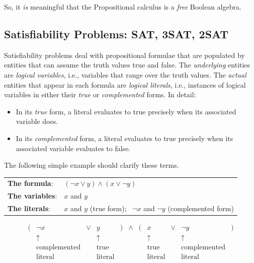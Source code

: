 So, it {\em is} meaningful that the Propositional calculus is a {\em
  free} Boolean algebra.


\subsection{Satisfiability Problems: {\sf SAT}, {\sf 3SAT}, {\sf 2SAT}}
\label{sec:Satisfiability}

Satisfiability problems deal with propositional formulae that are
populated by entities that can assume the truth values {\sc
  true} and {\sc false}. 
The {\em underlying} entities are {\it logical variables},
i.e., variables that range over the truth values.  The {\em actual}
entities that appear in each formula are {\it logical literals}, 
i.e., instances of logical variables in either their {\em true} or
{\em complemented} forms.
In detail:
\begin{itemize}
\item
In its {\em true} form, a literal evaluates to {\sc true}
precisely when its associated variable does.
\item
In its {\em complemented} form, a literal evaluates to {\sc
  true} precisely when its associated variable evaluates to {\sc
  false}.
\end{itemize}
The following simple example should clarify these terms.

\begin{tabular}{ll}
{\bf The formula}:  & $(\neg {x} \vee y) \wedge (x \vee \neg{y})$ \\
{\bf The variables}: & $x$ and $y$ \\
{\bf The literals}:  & $x$ and $y$ (true form); \ $\neg {x}$ and $\neg {y}$
(complemented form)
\end{tabular}
\[
\begin{array}{ccccccccccc}
( & \neg {x} & \vee & y & ) & \wedge & ( & x & \vee & \neg{y} & ) \\
  & \uparrow &     & \uparrow & & & & \uparrow & & \uparrow & \\
  & \mbox{complemented} &  & \mbox{true}  & & & & \mbox{true} &
        & \mbox{complemented} &  \\
  & \mbox{literal} & & \mbox{literal} & & & & \mbox{literal} & &
  \mbox{literal} & 
\end{array}
\]

